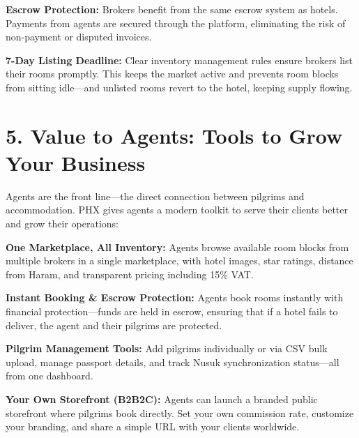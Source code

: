 \documentclass[11pt,a4paper]{article}
\begin{document}
\vspace{0.3cm}

\textbf{Escrow Protection:} Brokers benefit from the same escrow system as hotels. Payments from agents are secured through the platform, eliminating the risk of non-payment or disputed invoices.

\vspace{0.3cm}

\textbf{7-Day Listing Deadline:} Clear inventory management rules ensure brokers list their rooms promptly. This keeps the market active and prevents room blocks from sitting idle---and unlisted rooms revert to the hotel, keeping supply flowing.

\section*{5. Value to Agents: Tools to Grow Your Business}


Agents are the front line---the direct connection between pilgrims and accommodation. PHX gives agents a modern toolkit to serve their clients better and grow their operations:


\vspace{0.3cm}

\textbf{One Marketplace, All Inventory:} Agents browse available room blocks from multiple brokers in a single marketplace, with hotel images, star ratings, distance from Haram, and transparent pricing including 15\% VAT.

\vspace{0.3cm}

\textbf{Instant Booking \& Escrow Protection:} Agents book rooms instantly with financial protection---funds are held in escrow, ensuring that if a hotel fails to deliver, the agent and their pilgrims are protected.

\vspace{0.3cm}

\textbf{Pilgrim Management Tools:} Add pilgrims individually or via CSV bulk upload, manage passport details, and track Nusuk synchronization status---all from one dashboard.

\vspace{0.3cm}

\textbf{Your Own Storefront (B2B2C):} Agents can launch a branded public storefront where pilgrims book directly. Set your own commission rate, customize your branding, and share a simple URL with your clients worldwide.

\vspace{0.3cm}
\end{document}
